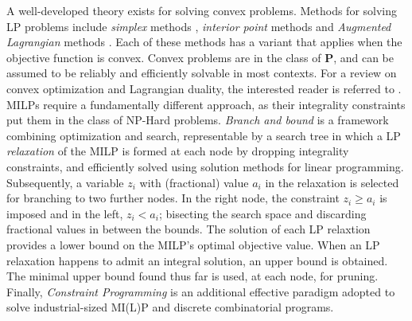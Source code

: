 A well-developed theory exists for solving convex problems. 
Methods for solving LP problems include \emph{simplex} methods , \emph{interior point} methods  and \emph{Augmented Lagrangian} methods .
Each of these methods has a variant that applies when the objective function is convex. Convex problems   are in the class of $\bm{P}$, and can be assumed to be reliably and efficiently solvable in most contexts. For a review on convex optimization and Lagrangian duality, the interested reader is referred to .
MILPs require a fundamentally different approach, as their integrality constraints put them in the class of NP-Hard problems. 
\emph{Branch and bound} is a framework combining optimization and search, representable by a search tree in which a LP \emph{relaxation} of the MILP is formed at each node by dropping integrality constraints, and efficiently solved using solution methods for linear programming. Subsequently, a variable $z_i$ with (fractional) value $a_i$ in the relaxation is selected for branching to two further nodes. In the right node, the constraint $z_i \geq a_i$ is imposed and in the left, $z_i < a_i$;  bisecting the search space and discarding fractional values in between the bounds. The solution of each LP relaxtion provides a lower bound on the MILP's optimal objective value. When an LP relaxation happens to admit an integral solution, an upper bound is obtained. The minimal upper bound found thus far is used, at each node, for pruning.
Finally, \emph{Constraint Programming}  is an additional effective paradigm adopted to solve industrial-sized MI(L)P and discrete combinatorial programs.

\iffalse

